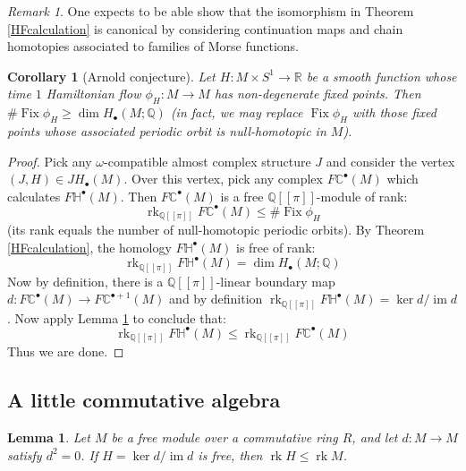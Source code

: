 \documentclass[12pt]{article}
\newtheorem{lemma}[theorem]{Lemma}
\newtheorem{corollary}[theorem]{Corollary}
\theoremstyle{definition}
\theoremstyle{remark}
\newtheorem{remark}[theorem]{Remark}
\numberwithin{equation}{subsection}
\newcommand{\CC}{\mathbb C}
\newcommand{\RR}{\mathbb R}
\newcommand{\QQ}{\mathbb Q}
\newcommand{\HH}{\mathbb H}
\newcommand{\Fix}{\operatorname{Fix}}
\newcommand{\im}{\operatorname{im}}
\newcommand{\rk}{\operatorname{rk}}
\newcommand{\JH}{J\!H}
\begin{document}
\begin{remark}
One expects to be able show that the isomorphism in Theorem \ref{HFcalculation} is canonical by considering continuation maps and chain homotopies associated to families of Morse functions.
\end{remark}

\begin{corollary}[Arnold conjecture]
Let $H:M\times S^1\to\RR$ be a smooth function whose time $1$ Hamiltonian flow $\phi_H:M\to M$ has non-degenerate fixed points.  Then $\#\Fix\phi_H\geq\dim H_\bullet(M;\QQ)$ (in fact, we may replace $\Fix\phi_H$ with those fixed points whose associated periodic orbit is null-homotopic in $M$).
\end{corollary}

\begin{proof}
Pick any $\omega$-compatible almost complex structure $J$ and consider the vertex $(J,H)\in\JH_\bullet(M)$.  Over this vertex, pick any complex $F\CC^\bullet(M)$ which calculates $F\HH^\bullet(M)$.  Then $F\CC^\bullet(M)$ is a free $\QQ[[\pi]]$-module of rank:
\begin{equation}
\rk_{\QQ[[\pi]]}F\CC^\bullet(M)\leq\#\Fix\phi_H
\end{equation}
(its rank equals the number of null-homotopic periodic orbits).  By Theorem \ref{HFcalculation}, the homology $F\HH^\bullet(M)$ is free of rank:
\begin{equation}
\rk_{\QQ[[\pi]]}F\HH^\bullet(M)=\dim H_\bullet(M;\QQ)
\end{equation}
Now by definition, there is a $\QQ[[\pi]]$-linear boundary map $d:F\CC^\bullet(M)\to F\CC^{\bullet+1}(M)$ and by definition $\rk_{\QQ[[\pi]]}F\HH^\bullet(M)=\ker d/\im d$.  Now apply Lemma \ref{homologyhassmallerrank} to conclude that:
\begin{equation}
\rk_{\QQ[[\pi]]}F\HH^\bullet(M)\leq\rk_{\QQ[[\pi]]}F\CC^\bullet(M)
\end{equation}
Thus we are done.
\end{proof}

\subsection{A little commutative algebra}

\begin{lemma}\label{homologyhassmallerrank}
Let $M$ be a free module over a commutative ring $R$, and let $d:M\to M$ satisfy $d^2=0$.  If $H=\ker d/\im d$ is free, then $\rk H\leq\rk M$.
\end{lemma}
\end{document}
